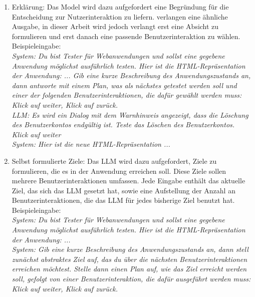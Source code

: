 \begin{enumerate}
{    LLM: Es wird ein Dialog mit dem Warnhinweis angezeigt, dass die Löschung des Benutzerkontos endgültig ist. Klick auf \dq weiter\dq
    \\
    System: Hier ist die neue HTML-Repräsentation ...
    }
    \item Erklärung: Das Model wird dazu aufgefordert eine Begründung für die Entscheidung zur Nutzerinteraktion zu liefern.
    \cite{GPT3Testing} verlangen eine ähnliche Ausgabe, in dieser Arbeit wird jedoch verlangt erst eine Absicht zu formulieren und erst danach eine passende Benutzerinteraktion zu wählen.
    \\
    Beispieleingabe:
    \\
    \textit{System: Du bist Tester für Webanwendungen und sollst eine gegebene Anwendung möglichst ausführlich testen.
    Hier ist die HTML-Repräsentation der Anwendung: ... 
    Gib eine kurze Beschreibung des Anwendungszustands an, dann antworte mit einem Plan, was als nächstes getestet werden soll und einer der folgenden Benutzerinteraktionen, die dafür gewählt werden muss: Klick auf \dq weiter\dq, Klick auf \dq zurück\dq. 
    \\
    LLM: Es wird ein Dialog mit dem Warnhinweis angezeigt, dass die Löschung des Benutzerkontos endgültig ist.
    Teste das Löschen des Benutzerkontos.
    Klick auf \dq weiter\dq
    \\
    System: Hier ist die neue HTML-Repräsentation ...
    }
    \item
    Selbst formulierte Ziele: Das LLM wird dazu aufgefordert, Ziele zu formulieren, die es in der Anwendung erreichen soll.
    Diese Ziele sollen mehrere Benutzerinteraktionen umfassen.
    Jede Eingabe enthält das aktuelle Ziel, das sich das LLM gesetzt hat, sowie eine Aufstellung der Anzahl an Benutzerinteraktionen, die das LLM für jedes bisherige Ziel benutzt hat.
    \\
    Beispieleingabe:
    \\
    \textit{System: Du bist Tester für Webanwendungen und sollst eine gegebene Anwendung möglichst ausführlich testen.
    Hier ist die HTML-Repräsentation der Anwendung: ... 
    \\
    System: Gib eine kurze Beschreibung des Anwendungszustands an, dann stell zunächst abstraktes Ziel auf, das du über die nächsten Benutzerinteraktionen erreichen möchtest.
    Stelle dann einen Plan auf, wie das Ziel erreicht werden soll, gefolgt von einer Benutzerinteraktion, die dafür ausgeführt werden muss: Klick auf \dq weiter\dq, Klick auf \dq zurück\dq.
}
\end{enumerate}
